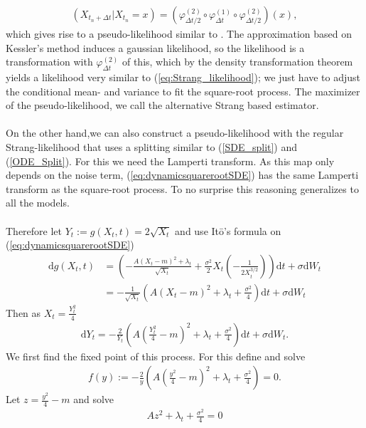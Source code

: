 \begin{align}
    \left(X_{t_n + \Delta t} | X_{t_n} = x\right) = \left(\varphi_{\Delta t/2}^{(2)} \circ \varphi_{\Delta t}^{(1)} \circ \varphi_{\Delta t/2}^{(2)}\right)(x),
\end{align} 
which gives rise to a pseudo-likelihood similar to \cite[(14)]{SplittingSchemes}. The approximation based on Kessler's method induces a gaussian likelihood, so the likelihood is a transformation with $\varphi_{\Delta t}^{(2)}$ of this, which by the density transformation theorem yields a likelihood very similar to (\ref{eq:Strang_likelihood}); we just have to adjust the conditional mean- and variance to fit the square-root process. The maximizer of the pseudo-likelihood, we call the alternative Strang based estimator.\\\\
On the other hand,we can also construct a pseudo-likelihood with the regular Strang-likelihood that uses a splitting similar to (\ref{SDE_split}) and (\ref{ODE_Split}). For this we need the Lamperti transform. As this map only depends on the noise term, (\ref{eq:dynamicsquarerootSDE}) has the same Lamperti transform as the square-root process. To no surprise this reasoning generalizes to all the models.\\\\
Therefore let $Y_t:= g(X_t, t) = 2\sqrt{X_t}$ and use Itō's formula on (\ref{eq:dynamicsquarerootSDE})
\begin{align}
    \mathrm{d}g(X_t, t) &= \left(-\frac{A(X_t - m)^2 + \lambda_t}{\sqrt{X_t}} + \frac{\sigma^2}{2}X_t\left(-\frac{1}{2X_t^{3/2}}\right)\right)\mathrm{d}t + \sigma\mathrm{d}W_t\nonumber \\
    &= -\frac{1}{\sqrt{X_t}}\left(A\left(X_t - m\right)^2 + \lambda_t + \frac{\sigma^2}{4}\right)\mathrm{d}t + \sigma\mathrm{d}W_t
\end{align}
Then as $X_t = \frac{Y_t^2}{4}$
\begin{align}
    \mathrm{d}Y_t = - \frac{2}{Y_t}\left(A\left(\frac{Y_t^2}{4} - m\right)^2 + \lambda_t + \frac{\sigma^2}{4}\right)\mathrm{d}t + \sigma \mathrm{d}W_t. \label{eq:lampertiTransformedDynamicSquareroot}
\end{align}
We first find the fixed point of this process. For this define and solve
\begin{align}
    f(y) := -\frac{2}{y}\left(A\left(\frac{y^2}{4}-m\right)^2 + \lambda_t + \frac{\sigma^2}{4}\right) = 0.
\end{align}
Let $z = \frac{y^2}{4}-m$ and solve
\begin{align}
    Az^2 + \lambda_t + \frac{\sigma^2}{4} = 0
\end{align}

